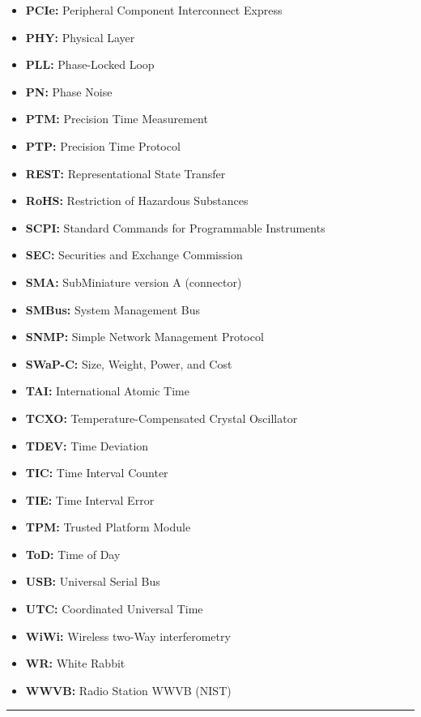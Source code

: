 \documentclass[
]{article}
\begin{document}
\begin{itemize}
  \textbf{OCXO:} Oven-Controlled Crystal Oscillator
\item
  \textbf{PCIe:} Peripheral Component Interconnect Express
\item
  \textbf{PHY:} Physical Layer
\item
  \textbf{PLL:} Phase-Locked Loop
\item
  \textbf{PN:} Phase Noise
\item
  \textbf{PTM:} Precision Time Measurement
\item
  \textbf{PTP:} Precision Time Protocol
\item
  \textbf{REST:} Representational State Transfer
\item
  \textbf{RoHS:} Restriction of Hazardous Substances
\item
  \textbf{SCPI:} Standard Commands for Programmable Instruments
\item
  \textbf{SEC:} Securities and Exchange Commission
\item
  \textbf{SMA:} SubMiniature version A (connector)
\item
  \textbf{SMBus:} System Management Bus
\item
  \textbf{SNMP:} Simple Network Management Protocol
\item
  \textbf{SWaP-C:} Size, Weight, Power, and Cost
\item
  \textbf{TAI:} International Atomic Time
\item
  \textbf{TCXO:} Temperature-Compensated Crystal Oscillator
\item
  \textbf{TDEV:} Time Deviation
\item
  \textbf{TIC:} Time Interval Counter
\item
  \textbf{TIE:} Time Interval Error
\item
  \textbf{TPM:} Trusted Platform Module
\item
  \textbf{ToD:} Time of Day
\item
  \textbf{USB:} Universal Serial Bus
\item
  \textbf{UTC:} Coordinated Universal Time
\item
  \textbf{WiWi:} Wireless two-Way interferometry
\item
  \textbf{WR:} White Rabbit
\item
  \textbf{WWVB:} Radio Station WWVB (NIST)
\end{itemize}

\begin{center}\rule{0.5\linewidth}{0.5pt}\end{center}
\end{document}

